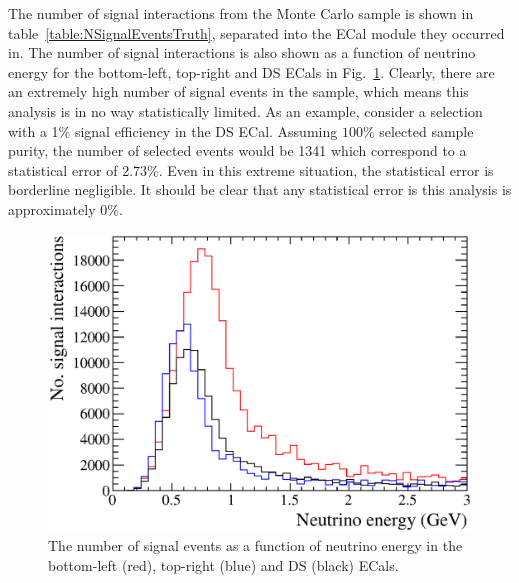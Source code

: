 The number of signal interactions from the Monte Carlo sample is shown in table~\ref{table:NSignalEventsTruth}, separated into the ECal module they occurred in.  The number of signal interactions is also shown as a function of neutrino energy for the bottom-left, top-right and DS ECals in Fig.~\ref{fig:NSignalEventsTruthNeutrinoEnergy}.  Clearly, there are an extremely high number of signal events in the sample, which means this analysis is in no way statistically limited.  As an example, consider a selection with a 1$\%$ signal efficiency in the DS ECal.  Assuming $100\%$ selected sample purity, the number of selected events would be 1341 which correspond to a statistical error of 2.73$\%$.  Even in this extreme situation, the statistical error is borderline negligible.  It should be clear that any statistical error is this analysis is approximately $0\%$.
\begin{figure}
  \centering
  \includegraphics[width=12cm]{images/selection/signal_definition/NSignalEventsNeutrinoEnergy.eps}
  \caption{The number of signal events as a function of neutrino energy in the bottom-left (red), top-right (blue) and DS (black) ECals.}
  \label{fig:NSignalEventsTruthNeutrinoEnergy}
\end{figure}
